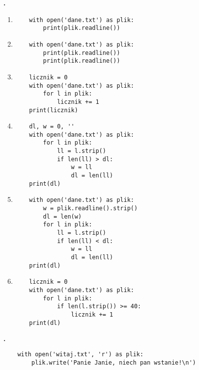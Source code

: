 \documentclass[a4paper]{article}
\begin{document}
\textbf{.}\addtocounter{zadanie}{1}
\begin{enumerate}[label=\arabic*.]
    \lstset{numbers=none}
    \item \begin{lstlisting}
    with open('dane.txt') as plik:
        print(plik.readline())
    \end{lstlisting}

    \item \begin{lstlisting}
    with open('dane.txt') as plik:
        print(plik.readline())
        print(plik.readline())
    \end{lstlisting}

    \item \begin{lstlisting}
    licznik = 0
    with open('dane.txt') as plik:
        for l in plik:
            licznik += 1
    print(licznik)
    \end{lstlisting}

    \item \begin{lstlisting}
    dl, w = 0, ''
    with open('dane.txt') as plik:
        for l in plik:
            ll = l.strip()
            if len(ll) > dl:
                w = ll
                dl = len(ll)
    print(dl)
    \end{lstlisting}

    \item \begin{lstlisting}
    with open('dane.txt') as plik:
        w = plik.readline().strip()
        dl = len(w)
        for l in plik:
            ll = l.strip()
            if len(ll) < dl:
                w = ll
                dl = len(ll)
    print(dl)
    \end{lstlisting}

    \item \begin{lstlisting}
    licznik = 0
    with open('dane.txt') as plik:
        for l in plik:
            if len(l.strip()) >= 40:
                licznik += 1
    print(dl)
    \end{lstlisting}

\end{enumerate}

\textbf{.}\addtocounter{zadanie}{1}
    \lstset{numbers=none}
    \begin{lstlisting}
    with open('witaj.txt', 'r') as plik:
        plik.write('Panie Janie, niech pan wstanie!\n')
    \end{lstlisting}
\end{document}
